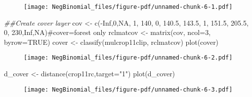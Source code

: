 \documentclass[
  letterpaper,
]{book}
\newenvironment{Shaded}{\begin{snugshade}}{\end{snugshade}}
\newcommand{\AttributeTok}[1]{\textcolor[rgb]{0.40,0.45,0.13}{#1}}
\newcommand{\CommentTok}[1]{\textcolor[rgb]{0.37,0.37,0.37}{#1}}
\newcommand{\ConstantTok}[1]{\textcolor[rgb]{0.56,0.35,0.01}{#1}}
\newcommand{\DecValTok}[1]{\textcolor[rgb]{0.68,0.00,0.00}{#1}}
\newcommand{\DocumentationTok}[1]{\textcolor[rgb]{0.37,0.37,0.37}{\textit{#1}}}
\newcommand{\FloatTok}[1]{\textcolor[rgb]{0.68,0.00,0.00}{#1}}
\newcommand{\FunctionTok}[1]{\textcolor[rgb]{0.28,0.35,0.67}{#1}}
\newcommand{\NormalTok}[1]{\textcolor[rgb]{0.00,0.23,0.31}{#1}}
\newcommand{\OtherTok}[1]{\textcolor[rgb]{0.00,0.23,0.31}{#1}}
\newcommand{\SpecialCharTok}[1]{\textcolor[rgb]{0.37,0.37,0.37}{#1}}
\newcommand{\StringTok}[1]{\textcolor[rgb]{0.13,0.47,0.30}{#1}}
\begin{document}
\begin{figure}[H]

{\centering \texttt{[image: NegBinomial\_files/figure-pdf/unnamed-chunk-6-1.pdf]}

}

\end{figure}

\begin{Shaded}
\begin{Highlighting}[]
\DocumentationTok{\#\#Create cover layer}
\NormalTok{cov }\OtherTok{\textless{}{-}} \FunctionTok{c}\NormalTok{(}\SpecialCharTok{{-}}\ConstantTok{Inf}\NormalTok{,}\DecValTok{0}\NormalTok{,}\ConstantTok{NA}\NormalTok{, }\DecValTok{1}\NormalTok{, }\DecValTok{140}\NormalTok{, }\DecValTok{0}\NormalTok{, }\FloatTok{140.5}\NormalTok{, }\FloatTok{143.5}\NormalTok{, }\DecValTok{1}\NormalTok{, }\FloatTok{151.5}\NormalTok{,}
  \FloatTok{205.5}\NormalTok{, }\DecValTok{0}\NormalTok{, }\DecValTok{230}\NormalTok{,}\ConstantTok{Inf}\NormalTok{,}\ConstantTok{NA}\NormalTok{)}\CommentTok{\#cover=forest only}
\NormalTok{rclmatcov }\OtherTok{\textless{}{-}} \FunctionTok{matrix}\NormalTok{(cov, }\AttributeTok{ncol=}\DecValTok{3}\NormalTok{, }\AttributeTok{byrow=}\ConstantTok{TRUE}\NormalTok{)}
\NormalTok{cover }\OtherTok{\textless{}{-}} \FunctionTok{classify}\NormalTok{(mulcrop11clip, rclmatcov)}
\FunctionTok{plot}\NormalTok{(cover)}
\end{Highlighting}
\end{Shaded}

\begin{figure}[H]

{\centering \texttt{[image: NegBinomial\_files/figure-pdf/unnamed-chunk-6-2.pdf]}

}

\end{figure}

\begin{Shaded}
\begin{Highlighting}[]
\NormalTok{d\_cover }\OtherTok{\textless{}{-}} \FunctionTok{distance}\NormalTok{(crop11rc,}\AttributeTok{target=}\StringTok{"1"}\NormalTok{)}
\FunctionTok{plot}\NormalTok{(d\_cover)}
\end{Highlighting}
\end{Shaded}

\begin{figure}[H]

{\centering \texttt{[image: NegBinomial\_files/figure-pdf/unnamed-chunk-6-3.pdf]}

}

\end{figure}
\end{document}
